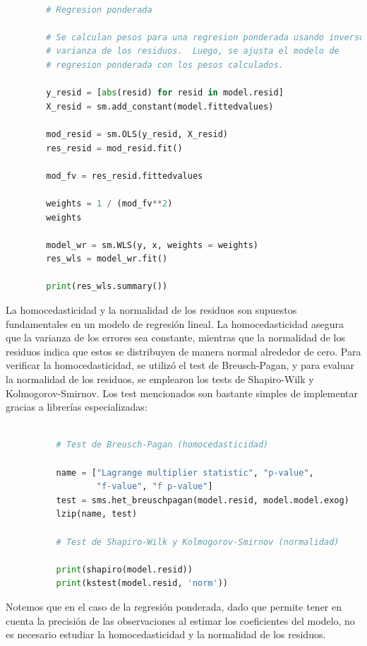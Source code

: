 \documentclass{article}[14pts]
\begin{document}
      \begin{lstlisting}[language= Python]

        # Regresion ponderada

        # Se calculan pesos para una regresion ponderada usando inversos de la 
        # varianza de los residuos.  Luego, se ajusta el modelo de 
        # regresion ponderada con los pesos calculados.

        y_resid = [abs(resid) for resid in model.resid]
        X_resid = sm.add_constant(model.fittedvalues)

        mod_resid = sm.OLS(y_resid, X_resid)
        res_resid = mod_resid.fit()

        mod_fv = res_resid.fittedvalues

        weights = 1 / (mod_fv**2)
        weights

        model_wr = sm.WLS(y, x, weights = weights)
        res_wls = model_wr.fit()

        print(res_wls.summary())
      \end{lstlisting}
    
    La homocedasticidad y la normalidad de los residuos son supuestos fundamentales en un modelo de regresión lineal. La homocedasticidad asegura que la varianza de los errores sea constante, mientras que la normalidad de los residuos indica que estos se distribuyen de manera normal alrededor de cero. Para verificar la homocedasticidad, se utilizó el test de Breusch-Pagan, y para evaluar la normalidad de los residuos, se emplearon los tests de Shapiro-Wilk y Kolmogorov-Smirnov. Los test mencionados son bastante simples de implementar gracias a librerías especializadas:

        \begin{lstlisting}[language= Python]

          # Test de Breusch-Pagan (homocedasticidad)

          name = ["Lagrange multiplier statistic", "p-value", 
                  "f-value", "f p-value"]
          test = sms.het_breuschpagan(model.resid, model.model.exog)
          lzip(name, test)

          # Test de Shapiro-Wilk y Kolmogorov-Smirnov (normalidad)

          print(shapiro(model.resid))
          print(kstest(model.resid, 'norm'))

        \end{lstlisting}

    Notemos que en el caso de la regresión ponderada, dado que permite tener en cuenta la precisión de las observaciones al estimar los coeficientes del modelo, no es necesario estudiar la homocedasticidad y la normalidad de los residuos.
\end{document}
